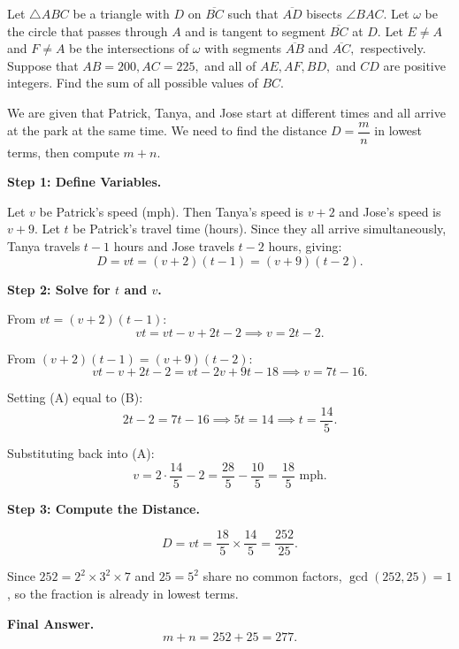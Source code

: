 \documentclass{llmxive}
\begin{document}
\begin{tcolorbox}[title=Question, breakable]
\label{resoning chains}
Let $\triangle ABC$ be a triangle with $D$ on $\overline{BC}$ such that $\overline{AD}$ bisects $\angle BAC.$ Let $\omega$ be the circle that passes through $A$ and is tangent to segment $\overline{BC}$ at $D.$ Let $E \neq A$ and $F \neq A$ be the intersections of $\omega$ with segments $\overline{AB}$ and $\overline{AC},$ respectively. Suppose that $AB = 200, AC = 225,$ and all of $AE, AF, BD,$ and $CD$ are positive integers. Find the sum of all possible values of $BC.$
\end{tcolorbox}

\begin{tcolorbox}[title=Base Model, breakable]
We are given that Patrick, Tanya, and Jose start at different times and all                                                                                                    
arrive at the park at the same time. We need to find the distance $D = \dfrac{m}{n}$                                                                                           
in lowest terms, then compute $m+n$.                                                                                                                                           

\medskip                                                                                                                                                                       
\textbf{Step 1: Define Variables.}

Let $v$ be Patrick's speed (mph). Then Tanya's speed is $v+2$ and Jose's speed
is $v+9$. Let $t$ be Patrick's travel time (hours). Since they all arrive
simultaneously, Tanya travels $t-1$ hours and Jose travels $t-2$ hours, giving:
\[
D = vt = (v+2)(t-1) = (v+9)(t-2).
\]

\medskip
\textbf{Step 2: Solve for $t$ and $v$.}

From $vt = (v+2)(t-1)$:
\[
vt = vt - v + 2t - 2 \implies v = 2t-2. \tag{A}
\]

From $(v+2)(t-1) = (v+9)(t-2)$:
\[
vt - v + 2t - 2 = vt - 2v + 9t - 18 \implies v = 7t - 16. \tag{B}
\]

Setting (A) equal to (B):
\[
2t - 2 = 7t - 16 \implies 5t = 14 \implies t = \frac{14}{5}.
\]

Substituting back into (A):
\[
v = 2\cdot\frac{14}{5} - 2 = \frac{28}{5} - \frac{10}{5} = \frac{18}{5} \text{ mph}.
\]

\medskip
\textbf{Step 3: Compute the Distance.}

\[
D = vt = \frac{18}{5} \times \frac{14}{5} = \frac{252}{25}.
\]

Since $252 = 2^2\times 3^2\times 7$ and $25 = 5^2$ share no common factors,                                                                                                    
$\gcd(252,25)=1$, so the fraction is already in lowest terms.
      
\medskip        
\textbf{Final Answer.}
\[
m + n = 252 + 25 = \boxed{277}.
\]
\end{tcolorbox}
\end{document}
